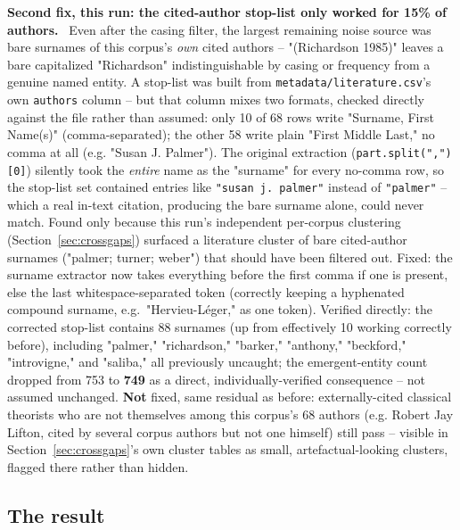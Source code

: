 \documentclass[11pt,a4paper]{article}
\newenvironment{fixbox}[1][What was fixed]
  {\par\vspace{6pt}\noindent{\color{fixline}\rule{\linewidth}{0.8pt}}\par\vspace{3pt}
   \noindent\small\textcolor{fixline}{\textbf{#1.}}\ \ignorespaces}
  {\par\vspace{3pt}\noindent{\color{fixline}\rule{\linewidth}{0.8pt}}\vspace{6pt}\par}
\begin{document}
\begin{fixbox}[Second fix, this run: the cited-author stop-list only worked for 15\% of authors]
Even after the casing filter, the largest remaining noise source was
bare surnames of this corpus's \emph{own} cited authors -- "(Richardson
1985)" leaves a bare capitalized "Richardson" indistinguishable by
casing or frequency from a genuine named entity. A stop-list was built
from \texttt{metadata/literature.csv}'s own \texttt{authors} column --
but that column mixes two formats, checked directly against the file
rather than assumed: only 10 of 68 rows write "Surname, First Name(s)"
(comma-separated); the other 58 write plain "First Middle Last," no
comma at all (e.g. "Susan J. Palmer"). The original extraction
(\texttt{part.split(",")[0]}) silently took the \emph{entire} name as
the "surname" for every no-comma row, so the stop-list set contained
entries like \texttt{"susan j. palmer"} instead of \texttt{"palmer"} --
which a real in-text citation, producing the bare surname alone, could
never match. Found only because this run's independent per-corpus
clustering (Section~\ref{sec:crossgaps}) surfaced a literature cluster
of bare cited-author surnames ("palmer; turner; weber") that should have
been filtered out. Fixed: the surname extractor now takes everything
before the first comma if one is present, else the last
whitespace-separated token (correctly keeping a hyphenated compound
surname, e.g.\ "Hervieu-L\'eger," as one token). Verified directly: the
corrected stop-list contains 88 surnames (up from effectively 10 working
correctly before), including "palmer," "richardson," "barker,"
"anthony," "beckford," "introvigne," and "saliba," all previously
uncaught; the emergent-entity count dropped from 753 to \textbf{749} as
a direct, individually-verified consequence -- not assumed unchanged.
\textbf{Not} fixed, same residual as before: externally-cited classical
theorists who are not themselves among this corpus's 68 authors (e.g.
Robert Jay Lifton, cited by several corpus authors but not one himself)
still pass -- visible in Section~\ref{sec:crossgaps}'s own cluster
tables as small, artefactual-looking clusters, flagged there rather than
hidden.
\end{fixbox}

\subsection{The result}
\end{document}
